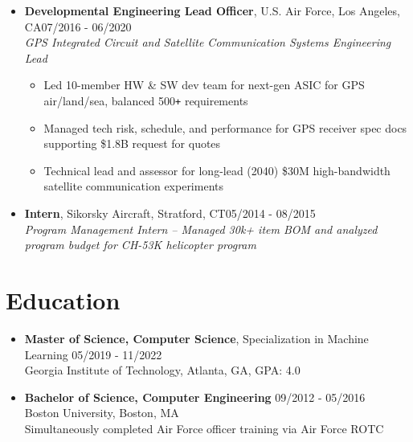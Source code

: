 \documentclass{article}
\begin{document}
\begin{itemize}
    \item \textbf{Developmental Engineering Lead Officer}, U.S. Air Force, Los Angeles, CA\hfill 07/2016 - 06/2020 \\ \emph{GPS Integrated Circuit and Satellite Communication Systems Engineering Lead}
    \begin{itemize}
        \itemsep0em
        \item Led 10-member HW \& SW dev team for next-gen ASIC for GPS air/land/sea, balanced 500\verb!+! requirements
        \item Managed tech risk, schedule, and performance for GPS receiver spec docs supporting \$1.8B request for quotes
        \item Technical lead and assessor for long-lead (2040) \$30M high-bandwidth satellite communication experiments
    \end{itemize}
    
    \item \textbf{Intern}, Sikorsky Aircraft, Stratford, CT\hfill 05/2014 - 08/2015 \\ \emph{Program Management Intern -- Managed 30k+ item BOM and analyzed program budget for CH-53K helicopter program}
    \end{itemize} 


\section{Education} \begin{itemize}
    \itemsep0.2em
    \item \textbf{Master of Science, Computer Science}, Specialization in Machine Learning \hfill 05/2019 - 11/2022\\Georgia Institute of Technology, Atlanta, GA, GPA: 4.0
    \item \textbf{Bachelor of Science, Computer Engineering} \hfill 09/2012 - 05/2016\\Boston University, Boston, MA\\Simultaneously completed Air Force officer training via Air Force ROTC  \end{itemize} 

\end{document}
